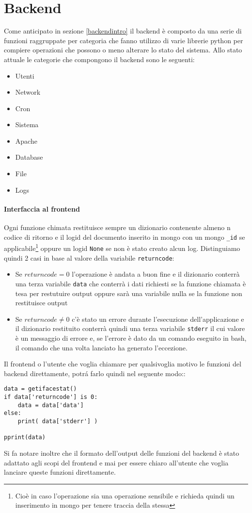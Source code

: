 \documentclass[11pt]{article}
\begin{document}
\section{Backend}\label{backend}
Come anticipato in sezione \ref{backendintro} il backend è composto da una serie di funzioni raggruppate per categoria
che fanno utilizzo di varie librerie python per compiere operazioni che possono o meno alterare lo stato del sistema.
Allo stato attuale le categorie che compongono il backend sono le seguenti:
\begin{itemize}
	\item{Utenti}
	\item{Network}
	\item{Cron}
	\item{Sistema}
	\item{Apache}
	\item{Database}
	\item{File}
	\item{Logs}
\end{itemize}

\paragraph{Interfaccia al frontend}\label{frontendinterface}
Ogni funzione chimata restituisce sempre un dizionario contenente almeno n codice di ritorno e il logid del documento inserito
in mongo con un mongo \texttt{\_id} se applicabile\footnote{\label{mongologwhen}
Cioè in caso l'operazione sia una operazione sensibile e richieda quindi un inserimento in mongo per tenere traccia della stessa}
oppure un logid \texttt{None} se non è stato creato alcun log.
Distinguiamo quindi 2 casi in base al valore della variabile \texttt{returncode}:
\begin{itemize}
	\item{Se $returncode = 0$ l'operazione è andata a buon fine e il dizionario conterrà una terza variabile \texttt{data}
		che conterrà i dati richiesti se la funzione chiamata è tesa per restutuire output oppure sarà una variabile nulla
		se la funzione non restituisce output}
	\item{Se $returncode \neq 0$ c'è stato un errore durante l'esecuzione dell'applicazione e il dizionario restituito conterrà
		quindi una terza variabile \texttt{stderr} il cui valore è un messaggio di errore e, se l'errore è dato da un comando
		eseguito in bash, il comando che una volta lanciato ha generato l'eccezione.}
\end{itemize}
Il frontend o l'utente che voglia chiamare per qualsivoglia motivo le funzioni del backend direttamente, potr\'a farlo quindi nel seguente modo::
\begin{lstlisting}
data = getifacestat()
if data['returncode'] is 0:
	data = data['data']
else:
	print( data['stderr'] )
 
pprint(data)
\end{lstlisting}
Si fa notare inoltre che il formato dell'output delle funzioni del backend è stato adattato agli scopi del frontend e mai per essere
chiaro all'utente che voglia lanciare queste funzioni direttamente.
\end{document}
